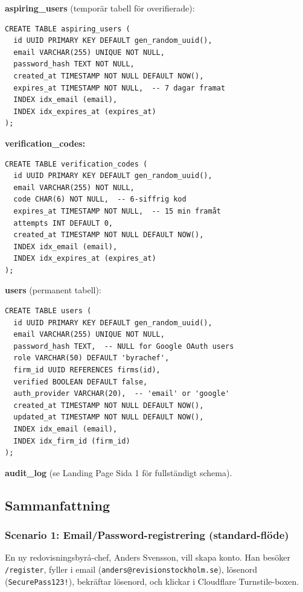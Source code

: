 \documentclass[12pt,a4paper]{article}
\begin{document}
\textbf{aspiring\_users} (temporär tabell för overifierade):
\begin{lstlisting}
CREATE TABLE aspiring_users (
  id UUID PRIMARY KEY DEFAULT gen_random_uuid(),
  email VARCHAR(255) UNIQUE NOT NULL,
  password_hash TEXT NOT NULL,
  created_at TIMESTAMP NOT NULL DEFAULT NOW(),
  expires_at TIMESTAMP NOT NULL,  -- 7 dagar framat
  INDEX idx_email (email),
  INDEX idx_expires_at (expires_at)
);
\end{lstlisting}

\textbf{verification\_codes:}
\begin{lstlisting}
CREATE TABLE verification_codes (
  id UUID PRIMARY KEY DEFAULT gen_random_uuid(),
  email VARCHAR(255) NOT NULL,
  code CHAR(6) NOT NULL,  -- 6-siffrig kod
  expires_at TIMESTAMP NOT NULL,  -- 15 min framåt
  attempts INT DEFAULT 0,
  created_at TIMESTAMP NOT NULL DEFAULT NOW(),
  INDEX idx_email (email),
  INDEX idx_expires_at (expires_at)
);
\end{lstlisting}

\textbf{users} (permanent tabell):
\begin{lstlisting}
CREATE TABLE users (
  id UUID PRIMARY KEY DEFAULT gen_random_uuid(),
  email VARCHAR(255) UNIQUE NOT NULL,
  password_hash TEXT,  -- NULL for Google OAuth users
  role VARCHAR(50) DEFAULT 'byrachef',
  firm_id UUID REFERENCES firms(id),
  verified BOOLEAN DEFAULT false,
  auth_provider VARCHAR(20),  -- 'email' or 'google'
  created_at TIMESTAMP NOT NULL DEFAULT NOW(),
  updated_at TIMESTAMP NOT NULL DEFAULT NOW(),
  INDEX idx_email (email),
  INDEX idx_firm_id (firm_id)
);
\end{lstlisting}

\textbf{audit\_log} (se Landing Page Sida 1 för fullständigt schema).


\subsection{Sammanfattning}

\subsubsection{Scenario 1: Email/Password-registrering (standard-flöde)}
En ny redovisningsbyrå-chef, Anders Svensson, vill skapa konto. Han besöker \texttt{/register}, fyller i email (\texttt{anders@revisionstockholm.se}), lösenord (\texttt{SecurePass123!}), bekräftar lösenord, och klickar i Cloudflare Turnstile-boxen.
\end{document}
